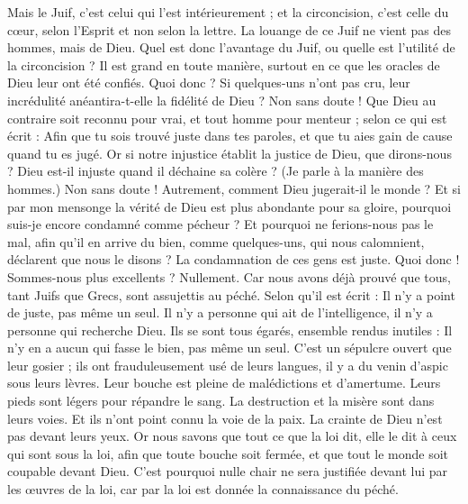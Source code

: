 \begin{multicols}{2}
Mais le Juif, c’est celui qui l’est intérieurement ; et la circoncision, c’est celle du cœur, selon l’Esprit et non selon la lettre. La louange de ce Juif ne vient pas des hommes, mais de Dieu.
\VerseOne{}Quel est donc l'avantage du Juif, ou quelle est l’utilité de la circoncision ?
Il est grand en toute manière, surtout en ce que les oracles de Dieu leur ont été confiés.
Quoi donc ? Si quelques-uns n'ont pas cru, leur incrédulité anéantira-t-elle la fidélité de Dieu ?
Non sans doute ! Que Dieu au contraire soit reconnu pour vrai, et tout homme pour menteur ; selon ce qui est écrit : Afin que tu sois trouvé juste dans tes paroles, et que tu aies gain de cause quand tu es jugé.
Or si notre injustice établit la justice de Dieu, que dirons-nous ? Dieu est-il injuste quand il déchaine sa colère ? (Je parle à la manière des hommes.)
Non sans doute ! Autrement, comment Dieu jugerait-il le monde ?
Et si par mon mensonge la vérité de Dieu est plus abondante pour sa gloire, pourquoi suis-je encore condamné comme pécheur ?
Et pourquoi ne ferions-nous pas le mal, afin qu'il en arrive du bien, comme quelques-uns, qui nous calomnient, déclarent que nous le disons ? La condamnation de ces gens est juste.
Quoi donc ! Sommes-nous plus excellents ? Nullement. Car nous avons déjà prouvé que tous, tant Juifs que Grecs, sont assujettis au péché.
Selon qu'il est écrit : Il n'y a point de juste, pas même un seul.
Il n'y a personne qui ait de l'intelligence, il n'y a personne qui recherche Dieu.
Ils se sont tous égarés, ensemble rendus inutiles : Il n'y en a aucun qui fasse le bien, pas même un seul.
C’est un sépulcre ouvert que leur gosier ; ils ont frauduleusement usé de leurs langues, il y a du venin d’aspic sous leurs lèvres.
Leur bouche est pleine de malédictions et d'amertume.
Leurs pieds sont légers pour répandre le sang.
La destruction et la misère sont dans leurs voies.
Et ils n'ont point connu la voie de la paix.
La crainte de Dieu n'est pas devant leurs yeux.
Or nous savons que tout ce que la loi dit, elle le dit à ceux qui sont sous la loi, afin que toute bouche soit fermée, et que tout le monde soit coupable devant Dieu.
C'est pourquoi nulle chair ne sera justifiée devant lui par les œuvres de la loi, car par la loi est donnée la connaissance du péché.

\end{multicols}
